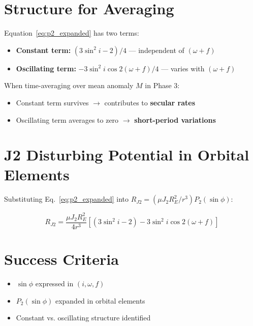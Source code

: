 \documentclass[11pt]{article}
\begin{document}
\section{Structure for Averaging}

Equation~\eqref{eq:p2_expanded} has two terms:

\begin{itemize}
    \item \textbf{Constant term:} $(3\sin^2 i - 2)/4$ — independent of $(\omega + f)$
    \item \textbf{Oscillating term:} $-3\sin^2 i \cos 2(\omega + f)/4$ — varies with $(\omega + f)$
\end{itemize}

When time-averaging over mean anomaly $M$ in Phase 3:
\begin{itemize}
    \item Constant term survives $\rightarrow$ contributes to \textbf{secular rates}
    \item Oscillating term averages to zero $\rightarrow$ \textbf{short-period variations}
\end{itemize}

\section{J2 Disturbing Potential in Orbital Elements}

Substituting Eq.~\eqref{eq:p2_expanded} into $R_{J2} = (\mu J_2 R_E^2/r^3) P_2(\sin \phi)$:

\begin{equation}
\boxed{R_{J2} = \frac{\mu J_2 R_E^2}{4r^3}\left[(3\sin^2 i - 2) - 3\sin^2 i \cos 2(\omega + f)\right]}
\label{eq:rj2_orbital}
\end{equation}

\section{Success Criteria}
\begin{itemize}
    \item[$\checkmark$] $\sin \phi$ expressed in $(i, \omega, f)$
    \item[$\checkmark$] $P_2(\sin \phi)$ expanded in orbital elements
    \item[$\checkmark$] Constant vs. oscillating structure identified
\end{itemize}
\end{document}
